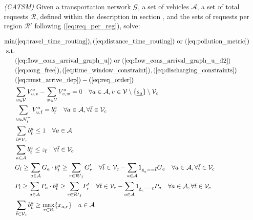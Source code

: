 \begin{algori}{\textit{(CATSM)}}
	Given a transportation network $\mathcal{G}$, a set of vehicles $\mathcal{A}$, a set of total requests $\mathcal{R}$, defined within the description in section ,  and the sets of requests per region $\mathcal{R}'$ following (\ref{eq:req_per_reg}), solve: \\
\end{algori}
\begin{align}
	\text{min}&  
		(\ref{eq:travel_time_routing}), (\ref{eq:distance_time_routing}) \text{ or } (\ref{eq:pollution_metric})
	\nonumber\\
	\text{s.t.} &\nonumber\\
	&(\ref{eq:flow_cons_arrival_graph_u}) \text{ or } (\ref{eq:flow_cons_arrival_graph_u_d2})\nonumber\\%
	&(\ref{eq:cong_free}),(\ref{eq:time_window_constraint}),(\ref{eq:discharging_constraints})\nonumber\\
	&(\ref{eq:must_arrive_dep})-(\ref{eq:req_order})\nonumber\\
	&\sum_{u \in \mathcal{V}} V^a_{u, v} - \sum_{w \in \mathcal{V}} V^a_{v, w} = 0 \quad \forall a \in \mathcal{A}, v \in \mathcal{V} \setminus \{\underline{s_a}\}\setminus\mathcal{V}_c  \label{eq:flow_conservation_graph_u2} \\	
	&\sum_{ u \in \mathcal{N}^-_{\bar{t}} }V^a_{u, \bar{t}} = b_{\bar{t}}^a \quad \forall a \in \mathcal{A},\forall \bar{t} \in \mathcal{V}_c  \label{eq:each_vehicle_end2}\\
	 &\sum_{\bar{t}\in \mathcal{V}_c} b_{\bar{t}}^a \leq 1\quad \forall a \in \mathcal{A}
	 \label{eq:one_depot_vehicle}\\
	&\sum_{a \in \mathcal{A}}b_{\bar{t}}^a  \leq z_{\bar{t}} \quad \forall \bar{t} \in \mathcal{V}_c \label{eq:capacity_depot_respected2}\\
	&G_{l}\ge\sum_{a \in \mathcal{A}} G_a \cdot b_{\bar{t}}^a \ge \sum_{r \in \mathcal{R'}_{\bar{t}}} G'_r \quad \forall \bar{t} \in \mathcal{V}_c - \sum_{a \in \mathcal{A}} 1_{\underline{s}_a == \bar{t}}G_a  \quad \forall a \in \mathcal{A},\forall \bar{t} \in \mathcal{V}_c\label{eq:goods_cap2}\\
	&P_{l}\ge\sum_{a \in \mathcal{A}}P_a \cdot b_{\bar{t}}^a\ge \sum_{r \in \mathcal{R'}_{\bar{t}}} P'_r \quad \forall \bar{t} \in \mathcal{V}_c - \sum_{a \in \mathcal{A}} 1_{\underline{s}_a == \bar{t}}P_a \quad \forall a \in \mathcal{A},\forall \bar{t} \in \mathcal{V}_c	\label{eq:people_cap2}\\
	&\sum_{\bar{t} \in \mathcal{V}_c}b_{\bar{t}}^a   \ge \underset{ r \in \mathcal{R}}{\max}\{x_{a,r}\}  \quad a \in \mathcal{A} \label{eq:rebalancing_moving}
\end{align}
